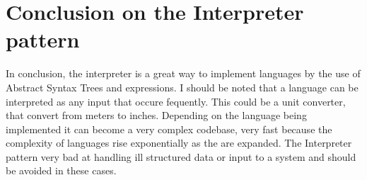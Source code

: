 \section{Conclusion on the Interpreter pattern}
In conclusion, the interpreter is a great way to implement languages
by the use of Abstract Syntax Trees and expressions. I should be
noted that a language can be interpreted as any input that occure
fequently. This could be a unit converter, that convert from meters to
inches.
Depending on the language being implemented it can become a very complex
codebase, very fast because the complexity of languages rise exponentially
as the are expanded.
The Interpreter pattern very bad at handling ill structured data or input
to a system and should be avoided in these cases.

